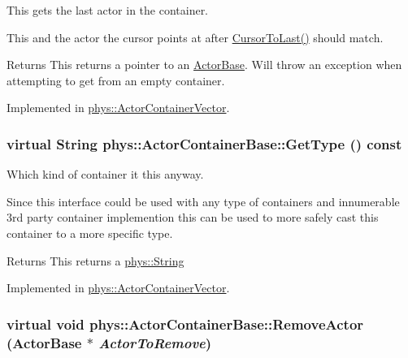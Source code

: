This gets the last actor in the container. 

This and the actor the cursor points at after \hyperlink{classphys_1_1ActorContainerBase_afad072e018a04c190e5e5fb93b82b354}{CursorToLast()} should match. \begin{DoxyReturn}{Returns}
This returns a pointer to an \hyperlink{classphys_1_1ActorBase}{ActorBase}. Will throw an exception when attempting to get from an empty container. 
\end{DoxyReturn}


Implemented in \hyperlink{classphys_1_1ActorContainerVector_a211f6e419ef0b753cecf2c662a54511e}{phys::ActorContainerVector}.

\hypertarget{classphys_1_1ActorContainerBase_a526dab176597858680490d128d0584a3}{
\subsubsection[{GetType}]{\setlength{\rightskip}{0pt plus 5cm}virtual {\bf String} phys::ActorContainerBase::GetType () const}}
\label{d1/d00/classphys_1_1ActorContainerBase_a526dab176597858680490d128d0584a3}


Which kind of container it this anyway. 

Since this interface could be used with any type of containers and innumerable 3rd party container implemention this can be used to more safely cast this container to a more specific type. \begin{DoxyReturn}{Returns}
This returns a \hyperlink{namespacephys_aa03900411993de7fbfec4789bc1d392e}{phys::String} 
\end{DoxyReturn}


Implemented in \hyperlink{classphys_1_1ActorContainerVector_a20d18213e69b3821ee973865df428e6d}{phys::ActorContainerVector}.

\hypertarget{classphys_1_1ActorContainerBase_a523072e42f6b581d044432f84a84ede4}{
\subsubsection[{RemoveActor}]{\setlength{\rightskip}{0pt plus 5cm}virtual void phys::ActorContainerBase::RemoveActor ({\bf ActorBase} $\ast$ {\em ActorToRemove})}}
\label{d1/d00/classphys_1_1ActorContainerBase_a523072e42f6b581d044432f84a84ede4}


